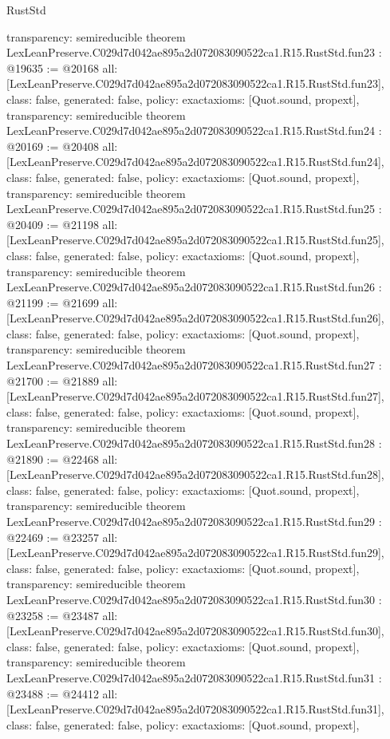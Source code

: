 \begin{lexlean}{RustStd}
\begin{coremodule}
{  transparency: semireducible
}
theorem LexLeanPreserve.C029d7d042ae895a2d072083090522ca1.R15.RustStd.fun23 : @19635 := @20168 {
  all: [LexLeanPreserve.C029d7d042ae895a2d072083090522ca1.R15.RustStd.fun23],
  class: false,
  generated: false,
  policy: exact{axioms: [Quot.sound, propext]},
  transparency: semireducible
}
theorem LexLeanPreserve.C029d7d042ae895a2d072083090522ca1.R15.RustStd.fun24 : @20169 := @20408 {
  all: [LexLeanPreserve.C029d7d042ae895a2d072083090522ca1.R15.RustStd.fun24],
  class: false,
  generated: false,
  policy: exact{axioms: [Quot.sound, propext]},
  transparency: semireducible
}
theorem LexLeanPreserve.C029d7d042ae895a2d072083090522ca1.R15.RustStd.fun25 : @20409 := @21198 {
  all: [LexLeanPreserve.C029d7d042ae895a2d072083090522ca1.R15.RustStd.fun25],
  class: false,
  generated: false,
  policy: exact{axioms: [Quot.sound, propext]},
  transparency: semireducible
}
theorem LexLeanPreserve.C029d7d042ae895a2d072083090522ca1.R15.RustStd.fun26 : @21199 := @21699 {
  all: [LexLeanPreserve.C029d7d042ae895a2d072083090522ca1.R15.RustStd.fun26],
  class: false,
  generated: false,
  policy: exact{axioms: [Quot.sound, propext]},
  transparency: semireducible
}
theorem LexLeanPreserve.C029d7d042ae895a2d072083090522ca1.R15.RustStd.fun27 : @21700 := @21889 {
  all: [LexLeanPreserve.C029d7d042ae895a2d072083090522ca1.R15.RustStd.fun27],
  class: false,
  generated: false,
  policy: exact{axioms: [Quot.sound, propext]},
  transparency: semireducible
}
theorem LexLeanPreserve.C029d7d042ae895a2d072083090522ca1.R15.RustStd.fun28 : @21890 := @22468 {
  all: [LexLeanPreserve.C029d7d042ae895a2d072083090522ca1.R15.RustStd.fun28],
  class: false,
  generated: false,
  policy: exact{axioms: [Quot.sound, propext]},
  transparency: semireducible
}
theorem LexLeanPreserve.C029d7d042ae895a2d072083090522ca1.R15.RustStd.fun29 : @22469 := @23257 {
  all: [LexLeanPreserve.C029d7d042ae895a2d072083090522ca1.R15.RustStd.fun29],
  class: false,
  generated: false,
  policy: exact{axioms: [Quot.sound, propext]},
  transparency: semireducible
}
theorem LexLeanPreserve.C029d7d042ae895a2d072083090522ca1.R15.RustStd.fun30 : @23258 := @23487 {
  all: [LexLeanPreserve.C029d7d042ae895a2d072083090522ca1.R15.RustStd.fun30],
  class: false,
  generated: false,
  policy: exact{axioms: [Quot.sound, propext]},
  transparency: semireducible
}
theorem LexLeanPreserve.C029d7d042ae895a2d072083090522ca1.R15.RustStd.fun31 : @23488 := @24412 {
  all: [LexLeanPreserve.C029d7d042ae895a2d072083090522ca1.R15.RustStd.fun31],
  class: false,
  generated: false,
  policy: exact{axioms: [Quot.sound, propext]},
}
\end{coremodule}
\end{lexlean}
